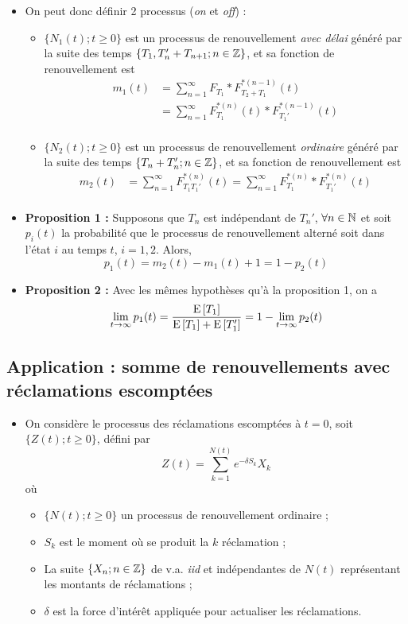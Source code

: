 \documentclass[10pt, french, landscape]{article}
\begin{document}
\begin{multicols*}{3}
\begin{itemize}
\item On peut donc définir 2 processus  (\emph{on} et \emph{off}) :  
\begin{itemize}
	\item $\{ N_1(t) ; t \geq 0 \}$ est un processus de renouvellement \emph{avec délai} généré par la suite des temps $\{ T_1, T_n' + T_{n+1} ; n \in \mathbb{Z} \}$, et sa fonction de renouvellement est
	\begin{align*}
	m_1(t) & = \sum_{n=1}^{\infty} F_{T_1} \ast F_{T_2 + T_1}
	^{\ast(n-1)}(t) \\
	& = \sum_{n=1}^{\infty} F_{T_1}^{\ast(n)}(t) \ast F_{T_1'}^{\ast(n-1)}(t) \\
	\end{align*}
	\item 	$\{ N_2(t) ; t \geq 0 \}$ est un processus de renouvellement \emph{ordinaire} généré par la suite des temps $\{ T_n + T_n'; n \in \mathbb{Z} \}$, et sa fonction de renouvellement est
	\begin{align*}
	m_2(t) &= \sum_{n=1}^{\infty} F_{T_1  T_1'}^{\ast(n)}(t) = \sum_{n=1}^{\infty} F_{T_1}^{\ast(n)} \ast F_{T_1'}^{\ast(n)}(t) \\
	\end{align*}
\end{itemize}
\item \textbf{Proposition 1 : } Supposons que $T_n$ est indépendant de $T_n'$, $\forall n \in \mathbb{N}$ et soit $p_i(t)$ la probabilité que le processus de renouvellement alterné soit dans l'état $i$ au temps $t$, $i=1,2$. Alors,
\[p_1(t) = m_2(t) - m_1(t) + 1 = 1 - p_2(t) \]

\item \textbf{Proposition 2 : } Avec les mêmes hypothèses qu'à la proposition 1, on a
\[\lim_{t \to \infty} p_1(t) = \frac{\mathrm{E} \left[ T_1 \right]}{\mathrm{E} \left[ T_1 \right] + \mathrm{E} \left[ T_1' \right]} = 1 - \lim_{t \to \infty} p_2(t) \]
\end{itemize}

\subsection*{Application : somme de renouvellements avec réclamations escomptées}
\begin{itemize}
\item On considère le processus des réclamations escomptées à $t=0$, soit $\{ Z(t) ; t \geq 0 \}$, défini par
\[Z(t) = \sum_{k=1}^{N(t)} e^{-\delta S_k} X_k  \]
où
\begin{itemize}
	\item $\{N(t) ; t \geq 0 \}$ un processus de renouvellement ordinaire ;
	\item $S_k$ est le moment où se produit la $k$ réclamation ;
	\item La suite $\{ X_n ; n \in \mathbb{Z} \}$ de v.a. \emph{iid} et indépendantes de $N(t)$ représentant les montants de réclamations ;
	\item $\delta$ est la force d'intérêt appliquée pour actualiser les réclamations.
\end{itemize}


\end{itemize}
\end{multicols*}
\end{document}
